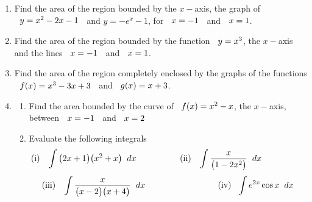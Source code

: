\documentclass[11pt,a4paper]{article}
\begin{document}
\begin{enumerate}
\item Find the area of the region bounded by the $x-$axis, the graph of $\hspace{0.2cm} y = x^2 - 2x - 1\hspace{0.2cm}$ and $y = -e^x - 1$, for $\hspace{0.2cm} x = -1\hspace{0.2cm}$ and $\hspace{0.2cm} x = 1$.

\item Find the area of the region bounded by the function $\hspace{0.2cm} y = x^3$, the $x-$axis and the lines $\hspace{0.2cm} x = -1\hspace{0.2cm}$ and $\hspace{0.2cm} x = 1$.

\item Find the area of the region completely enclosed by the graphs of the functions $\hspace{0.2cm} f(x) = x^3 - 3x + 3\hspace{0.2cm}$ and $\hspace{0.2cm} g(x) = x + 3$.

\item 
\begin{enumerate}
    \item Find the area bounded by the curve of $\hspace{0.2cm} f(x) = x^2 - x$, the $x-$axis, between $\hspace{0.2cm} x = -1\hspace{0.2cm}$ and $\hspace{0.2cm} x = 2$
    
    \item Evaluate the following integrals
    $$(\text{i})\hspace{0.3cm} \int \big(2x + 1\big)\big(x^2 + x\big)\hspace{0.2cm}dx \hspace{1.8cm} (\text{ii})\hspace{0.3cm} \int \dfrac{x}{\big(1 - 2x^2\big)}\hspace{0.2cm}dx\hspace{1.8cm}$$ $$(\text{iii})\hspace{0.3cm} \int \dfrac{x}{\big(x - 2\big)\big(x + 4\big)}\hspace{0.2cm}dx\hspace{3cm} (\text{iv})\hspace{0.3cm} \displaystyle{\int e^{2x}\cos x \hspace{0.2cm}dx}$$
\end{enumerate}



\end{enumerate}
\end{document}
